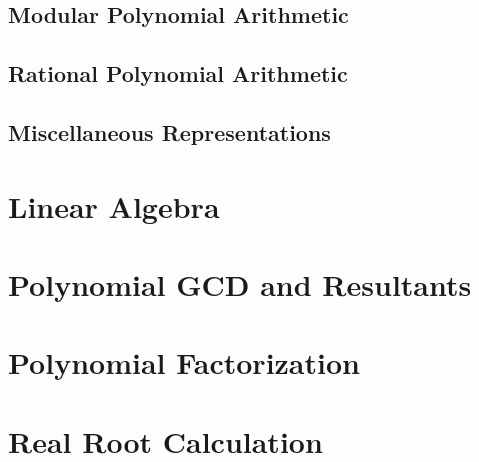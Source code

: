

\section{Modular Polynomial Arithmetic}
\label{c:PA s:MPA}



\section{Rational Polynomial Arithmetic}
\label{c:PA s:RPA}



\section{Miscellaneous Representations}
\label{c:PA s:MR}




\chapter{Linear Algebra}
\label{c:LA}


 

\chapter{Polynomial GCD and Resultants}
\label{c:GCD}




\chapter{Polynomial Factorization}
\label{c:PF}




\chapter{Real Root Calculation}
\label{c:RRC}

